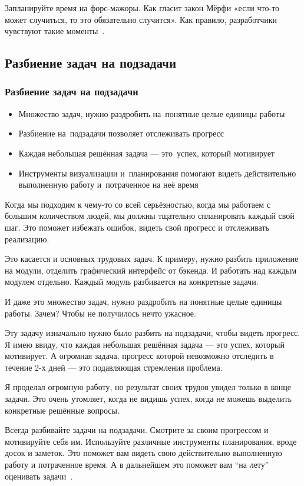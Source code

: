 \documentclass{../industrial-development}
\begin{document}
Запланируйте время на форс-мажоры. Как гласит закон Мёрфи «если что-то может случиться, то это обязательно случится». Как правило, разработчики чувствуют такие моменты~\cite{TMHabr}.

\subsection{Разбиение задач на подзадачи}

\begin{frame} \frametitle{Разбиение задач на подзадачи}
  \begin{itemize}
  \item Множество задач, нужно раздробить на~понятные целые единицы работы
  \item Разбиение на~подзадачи позволяет отслеживать прогресс
  \item Каждая небольшая решённая задача — это~успех, который мотивирует
  \item Инструменты визуализации и~планирования помогают видеть действительно выполненную работу и~потраченное на неё время
  \end{itemize}
\end{frame}

\lecturenotes

Когда мы подходим к чему-то со всей серьёзностью, когда мы работаем с большим количеством людей, мы должны тщательно спланировать каждый свой шаг. Это поможет избежать ошибок, видеть свой прогресс и отслеживать реализацию.

Это касается и основных трудовых задач. К примеру, нужно разбить приложение на модули, отделить графический интерфейс от бэкенда. И работать над каждым модулем отдельно.
Каждый модуль разбивается на конкретные задачи.

И даже это множество задач, нужно раздробить на понятные целые единицы работы. Зачем? Чтобы не получилось нечто ужасное.

Эту задачу изначально нужно было разбить на подзадачи, чтобы видеть прогресс. Я имею ввиду, что каждая небольшая решённая задача — это успех, который мотивирует. А огромная задача, прогресс которой невозможно отследить в течение 2-х дней — это подавляющая стремления проблема.

Я проделал огромную работу, но результат своих трудов увидел только в конце задачи. Это очень утомляет, когда не видишь успех, когда не можешь выделить конкретные решённые вопросы.

Всегда разбивайте задачи на подзадачи. Смотрите за своим прогрессом и мотивируйте себя им. Используйте различные инструменты планирования, вроде досок и заметок. Это поможет вам видеть свою действительно выполненную работу и потраченное время. А в дальнейшем это поможет вам “на лету” оценивать задачи~\cite{TasksMedium}.
\end{document}
